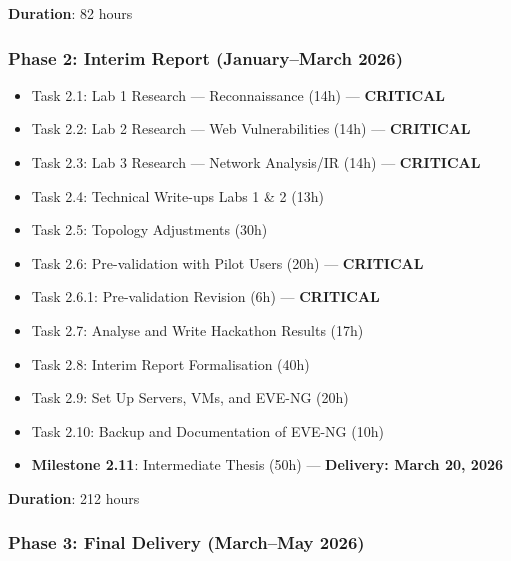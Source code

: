 \textbf{Duration}: 82 hours

\subsubsection{Phase 2: Interim Report (January--March 2026)}

\begin{itemize}
\tightlist
\item
  Task 2.1: Lab 1 Research --- Reconnaissance (14h) --- \textbf{CRITICAL}
\item
  Task 2.2: Lab 2 Research --- Web Vulnerabilities (14h) --- \textbf{CRITICAL}
\item
  Task 2.3: Lab 3 Research --- Network Analysis/IR (14h) --- \textbf{CRITICAL}
\item
  Task 2.4: Technical Write-ups Labs 1 \& 2 (13h)
\item
  Task 2.5: Topology Adjustments (30h)
\item
  Task 2.6: Pre-validation with Pilot Users (20h) --- \textbf{CRITICAL}
\item
  Task 2.6.1: Pre-validation Revision (6h) --- \textbf{CRITICAL}
\item
  Task 2.7: Analyse and Write Hackathon Results (17h)
\item
  Task 2.8: Interim Report Formalisation (40h)
\item
  Task 2.9: Set Up Servers, VMs, and EVE-NG (20h)
\item
  Task 2.10: Backup and Documentation of EVE-NG (10h)
\item
  \textbf{Milestone 2.11}: Intermediate Thesis (50h) --- \textbf{Delivery: March 20, 2026}
\end{itemize}

\textbf{Duration}: 212 hours

\subsubsection{Phase 3: Final Delivery (March--May 2026)}

